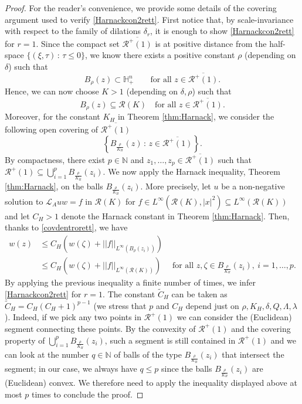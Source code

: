 \documentclass[12pt]{amsart}
\newcommand{\Lop}{\mathcal{L}}
\newcommand{\N}{{\mathbb N}}
\def \H {{\mathbb H}}
\def \r {\mathcal R}
\begin{document}
\begin{proof}
For the reader's convenience, we provide some details of the covering argument used to verify \eqref{Harnackcon2rett}. First notice that, by scale-invariance with respect to the family of dilations $\delta_r$, it is enough to show \eqref{Harnackcon2rett} for $r=1$. Since the compact set $\overline{\r^+(1)}$ is at positive distance from the half-space $\{(\xi,\tau)\,:\, \tau\leq 0\}$, we know there exists a positive constant $\rho$ (depending on $\delta$) such that
$$
B_\rho(z)\subset \H^n_+\quad \quad \text{for all } z\in \overline{\r^+(1)}.
$$
Hence, we can now choose $K>1$ (depending on $\delta, \rho$) such that
\begin{equation}\label{covdentrorett}
B_\rho(z)\subseteq \r(K) \quad \text{for all } z\in \overline{\r^+(1)}.
\end{equation}
Moreover, for the constant $K_H$ in Theorem \ref{thm:Harnack}, we consider the following open covering of $\overline{\r^+(1)}$ $$\left\{ B_{\frac{\rho}{K_H}}(z)\,:\, z\in \overline{\r^+(1)} \right\}.$$ 
By compactness, there exist $p\in \N$ and $z_1,\ldots, z_p \in \overline{\r^+(1)} $ such that $\r^+(1)\subseteq \bigcup_{i=1}^p B_{\frac{\rho}{K_H}}(z_i)$. We now apply the Harnack inequality, Theorem \ref{thm:Harnack}, on the balls $B_{\frac{\rho}{K_H}}(z_i)$. More precisely, let $u$ be a non-negative solution to $\Lop_A uw = f$ in $\r(K)$ for $f \in L^{\infty}(\r(K),|x|^2)\subseteq L^{\infty}(\r(K))$ and let $C_H>1$ denote the Harnack constant in Theorem  \ref{thm:Harnack}. Then, thanks to \eqref{covdentrorett}, we have
\begin{align*}
w(z) & \leq C_H\left(w(\zeta) + ||f||_{L^{\infty}(B_{\rho}(z_i))}\right)\\
& \leq C_H\left( w(\zeta) + ||f||_{L^{\infty}(\r(K))}\right)\quad \text{ for all } z,\zeta\in B_{\frac{\rho}{K_H}}(z_i), \ i= 1,\ldots,p.
\end{align*}
By applying the previous inequality a finite number of times, we infer \eqref{Harnackcon2rett} for $r=1$. The constant $\tilde{C}_H$ can be taken as $\tilde{C}_H=C_H(C_H+1)^{p-1}$ (we stress that $p$ and $C_H$ depend just on $\rho, K_H, \delta, Q, \Lambda, \lambda$). Indeed, if we pick any two points in $\r^+(1)$ we can consider the (Euclidean) segment connecting these points. By the convexity of $\r^+(1)$ and the covering property of $\bigcup_{i=1}^p B_{\frac{\rho}{K_H}}(z_i)$, such a segment is still contained in $\r^+(1)$ and we can look at the number $q\in\N$ of balls of the type $B_{\frac{\rho}{K_H}}(z_i)$ that intersect the segment; in our case, we always have $q\leq p$ since the balls $B_{\frac{\rho}{K_H}}(z_i)$ are (Euclidean) convex. We therefore need to apply the inequality displayed above at most $p$ times to conclude the proof.
\end{proof}
\end{document}
